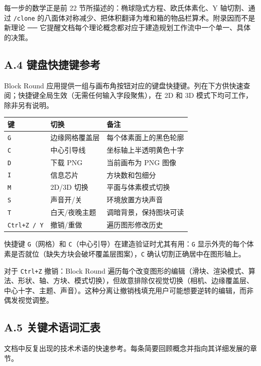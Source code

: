 \documentclass[12pt,a4paper]{scrartcl}
\newcommand{\code}[1]{\texttt{\small #1}}
\newcommand{\cmd}[1]{\textcolor{earth}{\texttt{\small #1}}}
\begin{document}
每一步的数学正是前 22 节所描述的：椭球隐式方程、欧氏体素化、Y 轴切割、通过 \cmd{/clone} 的八面体对称减少、把体积翻译为堆和箱的物品栏算术。附录因而不是新理论 ── 它提醒文档每个理论概念都对应于建造规划工作流中一个单一、具体的决策。

\subsection*{A.4 键盘快捷键参考}

Block Round 应用提供一组与画布角按钮对应的键盘快捷键。列在下方供快速查阅；快捷键全局生效（无需任何输入字段聚焦），在 2D 和 3D 模式下均可工作，除非另有说明。

\vspace{0.4em}
\begin{center}
\begin{tabular}{@{}lll@{}}
\toprule
\textbf{键} & \textbf{切换} & \textbf{备注} \\
\midrule
\code{G} & 边缘网格覆盖层  & 每个体素面上的黑色轮廓 \\
\code{C} & 中心引导线  & 坐标轴上半透明黄色十字 \\
\code{D} & 下载 PNG  & 当前画布为 PNG 图像 \\
\code{I} & 信息芯片  & 方块数和包细分 \\
\code{M} & 2D/3D 切换  & 平面与体素模式切换 \\
\code{S} & 声音开/关  & 环境放置方块声音 \\
\code{T} & 白天/夜晚主题  & 调暗背景，保持图块可读 \\
\code{Ctrl+Z / Y} & 撤销/重做  & 遍历图形修改历史 \\
\bottomrule
\end{tabular}
\end{center}

快捷键 \code{G}（网格）和 \code{C}（中心引导）在建造验证时尤其有用：\code{G} 显示外壳的每个体素是否就位（缺失方块会破坏覆盖层图案），\code{C} 确认切割正确居中在图形轴上。

对于 \code{Ctrl+Z} 撤销：Block Round 遍历每个改变图形的编辑（滑块、渲染模式、算法、形状、轴、方块、模式切换），但故意排除仅视觉切换（相机、边缘覆盖层、中心十字、主题、声音）。这种分离让撤销栈填充用户可能想要逆转的编辑，而非偶发视觉调整。

\subsection*{A.5 关键术语词汇表}

文档中反复出现的技术术语的快速参考。每条简要回顾概念并指向其详细发展的章节。
\end{document}
